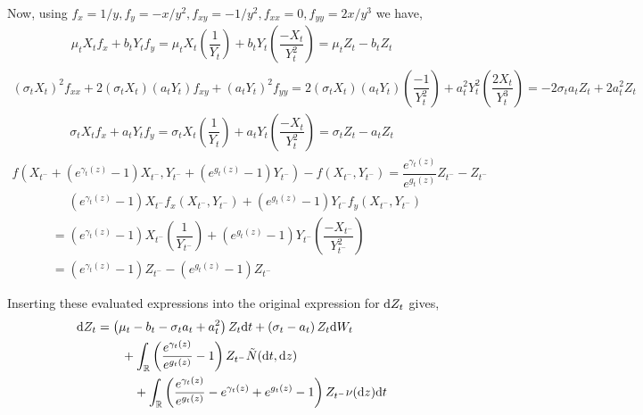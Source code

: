 \documentclass[10pt]{article}
\begin{document}
\begin{solution}[Solution]
\begin{enumerate}[label=(\alph*)]
        Now, using \( f_x = 1/y, f_y = -x/y^2, f_{xy} = -1/y^2, f_{xx} = 0, f_{yy} = 2x/y^3 \) we have,
        \begin{align*}
             \mu_t X_t f_x + b_tY_t f_y %
            = \mu_t X_t \left( \dfrac{1}{Y_t} \right) + b_t Y_t \left( \dfrac{-X_t}{Y_t^2} \right)
            = \mu_t Z_t - b_t Z_t
        \end{align*}
        \begin{align*}
            (\sigma_t X_t)^2 f_{xx} + 2(\sigma_t X_t)(a_tY_t) f_{xy} +  (a_tY_t)^2 f_{yy} 
            = 2(\sigma_t X_t)(a_tY_t) \left( \dfrac{-1}{Y_t^2} \right) + a_t^2 Y_t^2 \left( \dfrac{2X_t}{Y_t^3} \right)
            = -2\sigma_ta_tZ_t + 2a_t^2 Z_t 
        \end{align*}
        \begin{align*}
            \sigma_t X_t f_x + a_t Y_t f_y 
            = \sigma_t X_t \left( \dfrac{1}{Y_t} \right) + a_t Y_t \left( \dfrac{-X_t}{Y_t^2} \right)
            = \sigma_t Z_t - a_t Z_t 
        \end{align*}
        \begin{align*}
             f \left(X_{t^-}+(e^{\gamma_t(z)}-1)X_{t^-},Y_{t^-} + (e^{g_t(z)}-1)Y_{t^-} \right)  - f(X_{t^-},Y_{t^-}) 
            =  \dfrac{e^{\gamma_t(z)}}{e^{g_t(z)}} Z_{t^-} - Z_{t^-}
        \end{align*}
        \begin{align*}    
            & \phantom{{}={}}(e^{\gamma_t(z)}-1) X_{t^-} f_x(X_{t^-},Y_{t^-}) + (e^{g_t(z)}-1)Y_{t^-} f_y(X_{t^-},Y_{t^-})
            \\&= (e^{\gamma_t(z)}-1) X_{t^-} \left( \dfrac{1}{Y_{t^-}} \right)
            + (e^{g_t(z)}-1) Y_{t^-} \left( \dfrac{-X_{t^-}}{Y_{t^-}^2} \right)
            \\&= (e^{\gamma_t(z)}-1) Z_{t^-} - (e^{g_t(z)}-1)Z_{t^-}
        \end{align*}
       
        Inserting these evaluated expressions into the original expression for \( \mathrm{d} Z_t \) gives,
        \begin{align*}
            \mathrm{d} Z_t &= \left( \mu_t - b_t - \sigma_t a_t + a_t^2 \right)Z_t \mathrm{d} t
            + \left( \sigma_t - a_t \right) Z_t \mathrm{d} W_t
            \\& \hspace{2em}+ \int_{\mathbb{R}} \left( \dfrac{e^{\gamma_t(z)}}{e^{g_t(z)}}-1 \right)Z_{t^-} \tilde{N}(\mathrm{d} t, \mathrm{d} z)
            \\& \hspace{3em}+ \int_{\mathbb{R}} \left( \dfrac{e^{\gamma_t(z)}}{e^{g_t(z)}} - e^{\gamma_t(z)}+e^{g_t(z)}-1 \right)Z_{t^-} \nu(\mathrm{d} z)\mathrm{d} t
        \end{align*}
        

\end{enumerate}
\end{solution}
\end{document}
